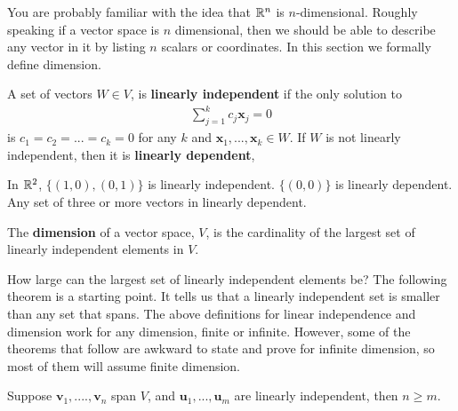 You are probably familiar with the idea that $\mathbb{R}^n$ is
$n$-dimensional. Roughly speaking if a vector space is $n$
dimensional, then we should be able to describe any vector in it by
listing $n$ scalars or coordinates.  In this section we formally
define dimension. 
\begin{definition}
  A set of vectors $W \in V$, is \textbf{linearly
    independent} if the only solution to
  \begin{align*}
    \sum_{j=1}^k c_j \mathbf{x}_j = 0 
  \end{align*}
  is $c_1 = c_2 = ... = c_k = 0$ for any $k$ and $\mathbf{x}_1, ...,
  \mathbf{x}_k \in W$. If $W$ is not linearly independent, then it is
  \textbf{linearly dependent},
\end{definition}
\begin{example}
  In $\mathbb{R}^2$, $\{(1,0), (0,1)\}$ is linearly independent. $\{(0,0)\}$
  is linearly dependent. Any set of three or more vectors in linearly
  dependent. 
\end{example}
\begin{definition}
  The \textbf{dimension} of a vector space, $V$, is the cardinality of
  the largest set of linearly independent elements in $V$.
\end{definition} 
How large can the largest set of linearly independent elements be? The
following theorem is a starting point. It tells us that a linearly
independent set is smaller than any set that spans. The above
definitions for linear independence and dimension work for any
dimension, finite or infinite. However, some of the theorems that
follow are awkward to state and prove for infinite dimension, so most
of them will assume finite dimension. 
\begin{theorem}\label{thm:spanLin}
  Suppose $\mathbf{v}_1, ...., \mathbf{v}_n$ span $V$, and 
  $\mathbf{u}_1, ..., \mathbf{u}_m$ are linearly independent, then  $n
  \geq m$. 
\end{theorem}
